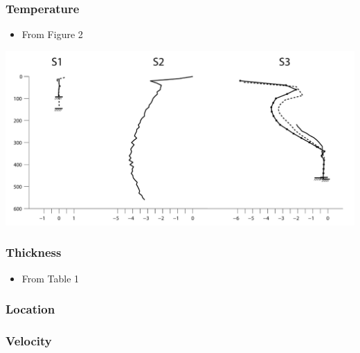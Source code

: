 \documentclass[article,a4paper,times,11pt,twoside]{article}
\begin{document}
\subsubsection{Temperature}
\label{sec:org9181cae}

\begin{itemize}
\item From \textcite{harrington_2015} Figure 2
\end{itemize}

\begin{center}
\includegraphics[width=.9\linewidth]{h2015_s1a/harrington_2015_fig2_S1_S2_S3.png}
\end{center}

\subsubsection{Thickness}
\label{sec:org8b3fad0}

\begin{itemize}
\item From \textcite{harrington_2015} Table 1
\end{itemize}

\subsubsection{Location}
\label{sec:org5cbbaa6}

\subsubsection{Velocity}
\label{sec:org427c736}
\clearpage
\end{document}
